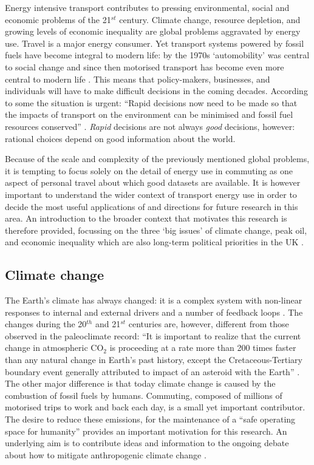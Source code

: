 \documentclass[a4paper, 11pt, twoside]{Thesis}
\begin{document}
Energy intensive transport
contributes to pressing environmental, social and economic problems of the
21$^{st}$ century. Climate change, resource depletion, and growing levels of
economic inequality are global problems aggravated by energy use.
Travel is a major energy consumer. Yet transport
systems powered by fossil fuels have become integral to modern life:
by the 1970s `automobility' was central to social change \citep{Illich1974}
and since then motorised transport has become even more central to
modern life \citep{Rodrigue2009}.
This means that policy-makers, businesses, and individuals
 will have to make difficult decisions in the coming decades.
According to some the situation is urgent: ``Rapid decisions now need to
be made
so that the impacts of transport on the environment can be minimised and fossil
fuel resources conserved'' \citep[p.~354]{Chapman2007}. \emph{Rapid} decisions are not
always \emph{good} decisions, however: rational choices depend on good
information about the world. 

Because of the scale and complexity of the previously mentioned global
problems, it is tempting to focus solely on the detail of energy use in commuting
 as one aspect of personal travel about which good datasets are available.
It is however important to understand the wider context of 
transport energy use in order to decide the most useful applications of and
directions for future research in this area.
An introduction to the broader context that motivates this research is therefore
provided, focussing on the three `big issues' of climate change, peak oil,
and economic inequality which are also
long-term political priorities in the UK \citep{UKERC2010}.

\subsection{Climate change}
The Earth's climate has always changed: it is a complex system with non-linear
responses to internal and external drivers and a number of feedback loops
\citep{IPCC2007}. The changes during the 20$^{th}$ and 21$^{st}$ centuries are,
however, different from those observed in the paleoclimate record: ``It is
important to realize that the
current change in atmospheric CO$_{2}$ is proceeding at a rate more than 200
times faster than any natural change in Earth's past history, except
the Cretaceous-Tertiary boundary event generally attributed to impact of an
asteroid with the Earth'' \citep{Hay2011}. The other major difference is that
today climate change is caused by the combustion of fossil fuels by humans.
Commuting, composed of millions of motorised trips to work and back each day, is
a small yet important contributor. The desire to reduce these emissions, for the
maintenance of a ``safe operating space for humanity'' \citep{Rockstrom2009}
provides an important motivation for this research. An underlying aim is to
contribute ideas and information to the ongoing debate about how to mitigate
anthropogenic climate change \citep{Matschoss2011}.
\end{document}
